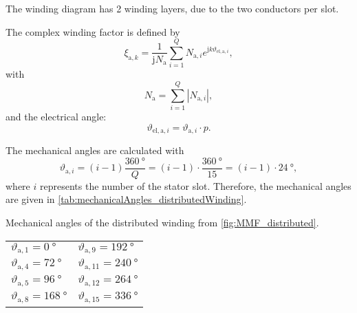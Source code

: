 
\begin{solutionblock}
    The winding diagram has 2 winding layers, due to the two conductors per slot.
\end{solutionblock}



\begin{solutionblock}
    The complex winding factor is defined by
    \begin{equation}
        \xi_{\mathrm{a,}k} = \frac{1}{\mathrm{j}N_{\mathrm{a}}} \sum_{i=1}^{Q} N_{\mathrm{a,}i}e^{\mathrm{j}k\vartheta_{\mathrm{el,a,}i}},
        \label{eq:complexWindingFactor}
    \end{equation}
    with
    \begin{equation}
        N_{\mathrm{a}} = \sum_{i=1}^{Q} |N_{\mathrm{a,}i} |,
    \end{equation}
    and the electrical angle:
    \begin{equation}
        \vartheta_{\mathrm{el,a,}i} = \vartheta_{\mathrm{a,}i} \cdot p.
    \end{equation}

    The mechanical angles are calculated with
    \begin{equation}
        \vartheta_{\mathrm{a,}i} = \left(i-1 \right) \frac{\SI{360}{\degree}}{Q}
        = \left(i-1 \right) \cdot \frac{\SI{360}{\degree}}{15}
        = \left(i-1 \right) \cdot \SI{24}{\degree},
    \end{equation}
    where $i$ represents the number of the stator slot.
    Therefore, the mechanical angles are given in \autoref{tab:mechanicalAngles_distributedWinding}.
    \begin{solutiontable}[h]
        \caption{Mechanical angles of the distributed winding from \autoref{fig:MMF_distributed}.}
        \centering
        \begin{tabular}{C{3cm}|C{3cm}}\toprule
            $\vartheta_{\mathrm{a,}1} = \SI{0}{\degree}$     & $\vartheta_{\mathrm{a,}9} = \SI{192}{\degree}$ \\
            $\vartheta_{\mathrm{a,}4} = \SI{72}{\degree}$    & $\vartheta_{\mathrm{a,}11} = \SI{240}{\degree}$ \\
            $\vartheta_{\mathrm{a,}5} = \SI{96}{\degree}$    & $\vartheta_{\mathrm{a,}12} = \SI{264}{\degree}$ \\
            $\vartheta_{\mathrm{a,}8} = \SI{168}{\degree}$   & $\vartheta_{\mathrm{a,}15} = \SI{336}{\degree}$ \\
            \bottomrule
        \end{tabular}
        \label{tab:mechanicalAngles_distributedWinding}
    \end{solutiontable}


\end{solutionblock}

